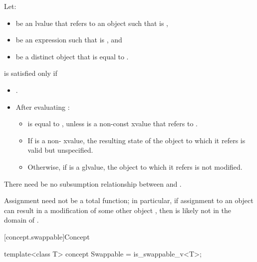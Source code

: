 \begin{itemdescr}
\pnum
Let:
\begin{itemize}
\item {} be an lvalue that refers to an object  such that
   is ,
\item {} be an expression such that  is
  , and
\item {} be a distinct object that is equal to .
\end{itemize}
 is satisfied only if

\begin{itemize}
\item {}.

\item After evaluating :

\begin{itemize}
\item {} is equal to , unless  is a non-const
xvalue that refers to .

\item If  is a non- xvalue, the resulting state of the
object to which it refers is valid but unspecified.

\item Otherwise, if  is a glvalue, the object to which it refers is
  not modified.
\end{itemize}
\end{itemize}

\pnum
There need be no subsumption relationship between
and
.

\pnum
\begin{note}
Assignment need not be a total function;
in particular, if assignment to an object  can result in a modification
of some other object , then  is likely not in the domain
of \tcode{=}.
\end{note}
\end{itemdescr}

[concept.swappable]{Concept }

%
\begin{itemdecl}
template<class T>
concept Swappable = is_swappable_v<T>;
\end{itemdecl}

